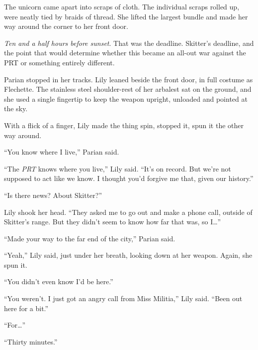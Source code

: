 The unicorn came apart into scraps of cloth.  The individual scraps rolled up, were neatly tied by braids of thread.  She lifted the largest bundle and made her way around the corner to her front door.



\emph{Ten and a half hours before sunset}.  That was the deadline.  Skitter's deadline, and the point that would determine whether this became an all-out war against the PRT or something entirely different.



Parian stopped in her tracks.  Lily leaned beside the front door, in full costume as Flechette.  The stainless steel shoulder-rest of her arbalest sat on the ground, and she used a single fingertip to keep the weapon upright, unloaded and pointed at the sky.



With a flick of a finger, Lily made the thing spin, stopped it, spun it the other way around.



``You know where I live,'' Parian said.



``The \emph{PRT} knows where you live,'' Lily said.  ``It's on record.  But we're not supposed to act like we know.  I thought you'd forgive me that, given our history.''



``Is there news?  About Skitter?''



Lily shook her head.  ``They asked me to go out and make a phone call, outside of Skitter's range.  But they didn't seem to know how far that was, so I\ldots''



``Made your way to the far end of the city,'' Parian said.



``Yeah,'' Lily said, just under her breath, looking down at her weapon.  Again, she spun it.



``You didn't even know I'd be here.''



``You weren't.  I just got an angry call from Miss Militia,'' Lily said.  ``Been out here for a bit.''



``For\ldots''



``Thirty minutes.''



